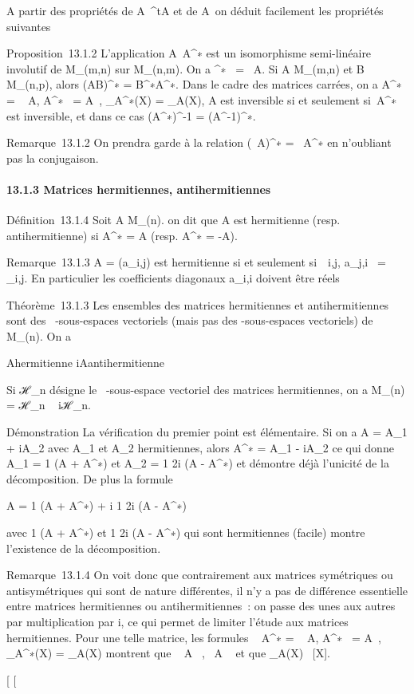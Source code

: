 \documentclass[]{article}
\begin{document}
A partir des propriétés de A\mapsto~^tA
et de A\mapsto~\overlineA on
déduit facilement les propriétés suivantes

Proposition~13.1.2 L'application
A\mapsto~A^∗ est un isomorphisme
semi-linéaire involutif de M_(m,n) sur M_(n,m). On a
\mathrmrgA^∗~
= \mathrmrg~A. Si A \in
M_(m,n) et B \in M_(n,p), alors (AB)^∗ =
B^∗A^∗. Dans le cadre des matrices carrées, on a
 A^∗~ =
\overline{}~
A,
A^∗~ =
\overline{}A~,
\chi_A^∗(X) =
\overline\chi_A(X), A est inversible si et
seulement si~A^∗ est inversible, et dans ce cas
(A^∗)^-1 = (A^-1)^∗.

Remarque~13.1.2 On prendra garde à la relation (\lambda~A)^∗ =
\overline\lambda~A^∗ en n'oubliant pas la
conjugaison.

\paragraph{13.1.3 Matrices hermitiennes, antihermitiennes}

Définition~13.1.4 Soit A \in M_(n). on dit que A est hermitienne
(resp. antihermitienne) si A^∗ = A (resp. A^∗ =
-A).

Remarque~13.1.3 A = (a_i,j) est hermitienne si et seulement
si~\forall~i,j, a_j,i~ =
\overlinea_i,j. En particulier les
coefficients diagonaux a_i,i doivent être réels

Théorème~13.1.3 Les ensembles des matrices hermitiennes et
antihermitiennes sont des ~-sous-espaces vectoriels (mais pas des
-sous-espaces vectoriels) de M_(n). On a

A\text hermitienne  \Leftrightarrow
iA\text antihermitienne

Si ℋ_n désigne le ~-sous-espace vectoriel des matrices
hermitiennes, on a M_(n) = ℋ_n \oplus~ iℋ_n.

Démonstration La vérification du premier point est élémentaire. Si on a
A = A_1 + iA_2 avec A_1 et A_2
hermitiennes, alors A^∗ = A_1 - iA_2 ce qui
donne A_1 = 1  (A + A^∗)
et A_2 = 1 \over 2i (A - A^∗) et
démontre déjà l'unicité de la décomposition. De plus la formule

A = 1  (A + A^∗) + i 1
\over 2i (A - A^∗)

avec  1  (A + A^∗) et  1
\over 2i (A - A^∗) qui sont hermitiennes
(facile) montre l'existence de la décomposition.

Remarque~13.1.4 On voit donc que contrairement aux matrices symétriques
ou antisymétriques qui sont de nature différentes, il n'y a pas de
différence essentielle entre matrices hermitiennes ou antihermitiennes~:
on passe des unes aux autres par multiplication par i, ce qui permet de
limiter l'étude aux matrices hermitiennes. Pour une telle matrice, les
formules ~
A^∗ =
\overline{}~
A,
A^∗~ =
\overline{}A~,
\chi_A^∗(X) =
\overline\chi_A(X) montrent que
~ A \in {}~,
~A \in {}~ et que
\chi_A(X) \in {}~[X].

[
[
\end{document}
